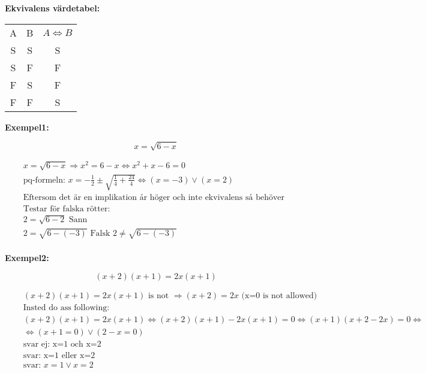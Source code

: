 \documentclass{article}
\begin{document}
\textbf{Ekvivalens värdetabel:}\par
\begin{center}
\begin{tabular}{ |c|c|c| } 
 \hline
 A  & B  & \(A \Leftrightarrow B\) \\ 
 S  & S  & S          \\ 
 S  & F  & F          \\  
 F  & S  & F          \\ 
 F  & F  & S          \\ 
 \hline
\end{tabular}
\end{center}


\textbf{Exempel1:}\par
\begin{equation}
  x = \sqrt{6 - x}
\end{equation}

\begin{align*}
  &\quad  x = \sqrt{6 - x} \Rightarrow x^2 = 6 - x \Leftrightarrow x^2 + x - 6 = 0 \\
  &\quad  \text{pq-formeln: } x = -\frac{1}{2} \pm \sqrt{\frac{1}{4} + \frac{24}{4}} \Leftrightarrow (x=-3) \lor (x=2) \\
  &\quad \text{Eftersom det är en implikation år höger och inte ekvivalens så behöver inte rötterna vara sanna }
  &\quad \\
  &\quad \text{Testar för falska rötter: } \\
  &\quad 2 = \sqrt{6-2} \text{ Sann} \\
  &\quad 2 = \sqrt{6-(-3)} \text{ Falsk } 2 \ne \sqrt{6-(-3)} \\
\end{align*}


\textbf{Exempel2:}\par
\begin{equation}
  (x+2)(x+1) = 2x(x+1)
\end{equation}

\begin{align*}
  &\quad (x+2)(x+1) = 2x(x+1) \text{ is not } \Rightarrow (x+2) = 2x \text{ (x=0 is not allowed)} \\
  &\quad \text{Insted do ass following: } \\
  &\quad (x+2)(x+1) = 2x(x+1) \Leftrightarrow (x+2)(x+1) - 2x(x+1) = 0 \Leftrightarrow (x+1)(x+2-2x) = 0 \Leftrightarrow \\
  &\quad \Leftrightarrow (x+1=0)\lor(2-x=0) \\
  &\quad \text{svar ej: x=1 och x=2} \\
  &\quad \text{svar: x=1 eller x=2} \\
  &\quad \text{svar: } x=1 \lor x=2 \\
\end{align*}
\end{document}
